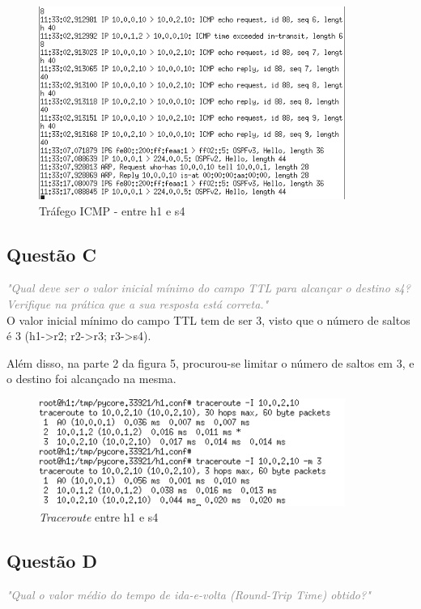 \documentclass{llncs}
\newcommand{\questionE}[1]{\textcolor{gray}{\textit{"#1"}}}
\begin{document}
\begin{figure}[H]
\begin{center}
\includegraphics[width=10cm]{1b.PNG}
\end{center}
\caption{Tráfego ICMP - entre h1 e s4}
\end{figure}

\subsection{Questão C}
\hspace{3mm}
\questionE{Qual deve ser o valor inicial mínimo do campo TTL para alcançar o destino s4? Verifique na prática que a sua resposta está correta.}\\

O valor inicial mínimo do campo TTL tem de ser 3, visto que o número de saltos é 3 (h1->r2; r2->r3; r3->s4).

Além disso, na parte 2 da figura 5, procurou-se limitar o número de saltos em 3, e o destino foi alcançado na mesma. 

\begin{figure}[H]
\begin{center}
\includegraphics[width=10cm]{1c.PNG}
\end{center}
\caption{\textit{Traceroute} entre h1 e s4}
\end{figure}

\subsection{Questão D}
\hspace{3mm}
\questionE{Qual o valor médio do tempo de ida-e-volta (Round-Trip Time) obtido?}\\
\end{document}
